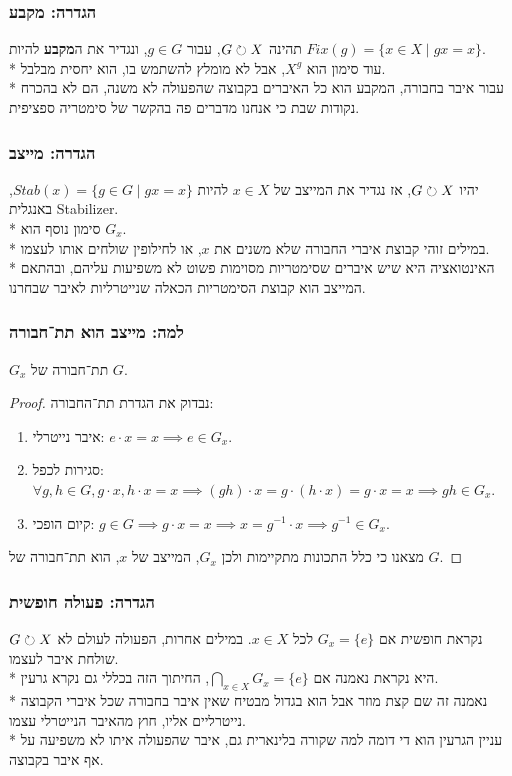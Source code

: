 \subsubsection{הגדרה: מקבע}
תהינה $G \circlearrowright X$, עבור $g \in G$, ונגדיר את ה\textbf{מקבע} להיות $ Fix(g) = \{ x \in X \mid gx = x \}$.\\*
עוד סימון הוא $X^g$, אבל לא מומלץ להשתמש בו, הוא יחסית מבלבל. \\*
עבור איבר בחבורה, המקבע הוא כל האיברים בקבוצה שהפעולה לא משנה, הם לא בהכרח נקודות שבת כי אנחנו מדברים פה בהקשר של סימטריה ספציפית.

\subsubsection{הגדרה: מייצב}
יהיו $G \circlearrowright X$, אז נגדיר  את המייצב של $x \in X$ להיות $Stab(x) = \{ g \in G \mid g x = x \}$, באנגלית Stabilizer. \\*
סימון נוסף הוא $G_x$. \\*
במילים זוהי קבוצת איברי החבורה שלא משנים את $x$, או לחילופין שולחים אותו לעצמו. \\*
האינטואציה היא שיש איברים שסימטריות מסוימות פשוט לא משפיעות עליהם, ובהתאם המייצב הוא קבוצת הסימטריות הכאלה שנייטרליות לאיבר שבחרנו.

\subsubsection{למה: מייצב הוא תת־חבורה}
$G_x$ תת־חבורה של $G$.
\begin{proof}
	נבדוק את הגדרת תת־החבורה:
	\begin{enumerate}
		\item איבר נייטרלי: $e \cdot x = x \implies e \in G_x$.
		\item סגירות לכפל: $\forall g, h \in G, g \cdot x, h \cdot x = x \implies (gh) \cdot x = g \cdot (h \cdot x) = g \cdot x = x \implies gh \in G_x$.
		\item קיום הופכי: $g \in G \implies g \cdot x = x \implies x = g^{-1} \cdot x \implies g^{-1} \in G_x$.
	\end{enumerate}
	מצאנו כי כלל התכונות מתקיימות ולכן $G_x$, המייצב של $x$, הוא תת־חבורה של $G$.
\end{proof}

\subsubsection{הגדרה: פעולה חופשית}
$G \circlearrowright X$ נקראת חופשית אם $G_x = \{e\}$ לכל $x \in X$. במילים אחרות, הפעולה לעולם לא שולחת איבר לעצמו. \\*
היא נקראת נאמנה אם $\bigcap_{x \in X} G_x = \{e\}$, החיתוך הזה בכללי גם נקרא גרעין. \\*
נאמנה זה שם קצת מוזר אבל הוא בגדול מבטיח שאין איבר בחבורה שכל איברי הקבוצה נייטרליים אליו, חוץ מהאיבר הנייטרלי עצמו. \\*
עניין הגרעין הוא די דומה למה שקורה בלינארית גם, איבר שהפעולה איתו לא משפיעה על אף איבר בקבוצה.


